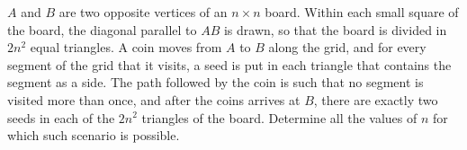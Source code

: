 $A$ and $B$ are two opposite vertices of an $n \times n$ board. Within each small square of the board, the diagonal parallel to $AB$ is drawn, so that the board is divided in $2n^{2}$ equal triangles. A coin moves from $A$ to $B$ along the grid, and for every segment of the grid that it visits, a seed is put in each triangle that contains the segment as a side. The path followed by the coin is such that no segment is visited more than once, and after the coins arrives at $B$,  there are exactly two seeds in each of the $2n^{2}$ triangles of the board. Determine all the values of $n$ for which such scenario is possible.